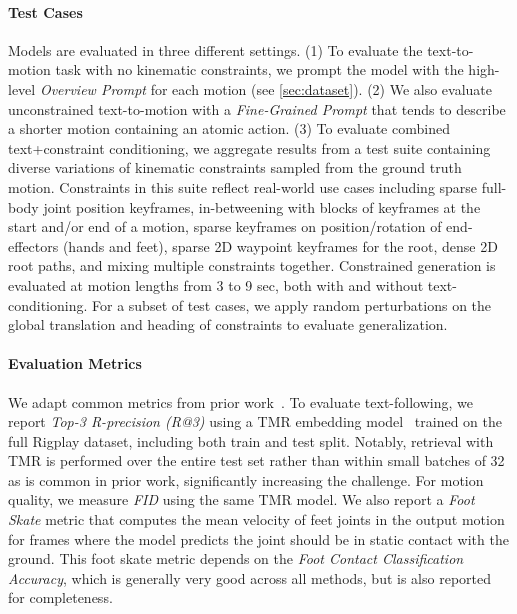 \paragraph{Test Cases}
Models are evaluated in three different settings. 
(1) To evaluate the text-to-motion task with no kinematic constraints, we prompt the model with the high-level \textit{Overview Prompt} for each motion (see \cref{sec:dataset}). 
(2) We also evaluate unconstrained text-to-motion with a \textit{Fine-Grained Prompt} that tends to describe a shorter motion containing an atomic action. 
(3) To evaluate combined text+constraint conditioning, we aggregate results from a test suite containing diverse variations of kinematic constraints sampled from the ground truth motion. Constraints in this suite reflect real-world use cases including sparse full-body joint position keyframes, in-betweening with blocks of keyframes at the start and/or end of a motion, sparse keyframes on position/rotation of end-effectors (hands and feet), sparse 2D waypoint keyframes for the root, dense 2D root paths, and mixing multiple constraints together. Constrained generation is evaluated at motion lengths from 3 to 9 sec, both with and without text-conditioning. For a subset of test cases, we apply random perturbations on the global translation and heading of constraints to evaluate generalization.

\paragraph{Evaluation Metrics}
We adapt common metrics from prior work~\cite{guo2022humanml3d}. 
To evaluate text-following, we report \textit{Top-3 R-precision (R@3)} using a TMR embedding model~\cite{petrovich23tmr} trained on the full Rigplay dataset, including both train and test split.  
Notably, retrieval with TMR is performed over the entire test set rather than within small batches of 32 as is common in prior work, significantly increasing the challenge.
For motion quality, we measure \textit{FID} using the same TMR model. We also report a \textit{Foot Skate} metric that computes the mean velocity of feet joints in the output motion for frames where the model predicts the joint should be in static contact with the ground. This foot skate metric depends on the \textit{Foot Contact Classification Accuracy}, which is generally very good across all methods, but is also reported for completeness. 

